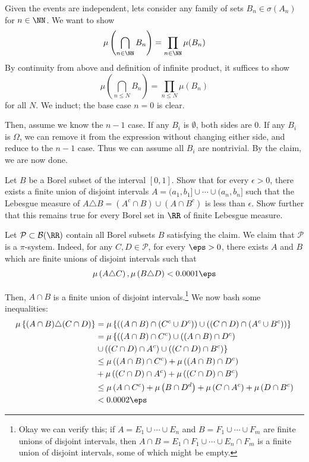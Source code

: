 \documentclass[11pt, headheight=30pt]{scrartcl}
\begin{document}
Given the events are independent, lets consider any family of
sets $B_n \in \sigma(A_n)$ for $n\in \NN$. We want to show
\[
    \mu\left(\bigcap_{n\in \NN} B_n\right) = \prod_{n \in \NN} \mu(B_n)
\]
By continuity from above and definition of infinite product,
it suffices to show
\[
    \mu\left(\bigcap_{n\leq N} B_n\right) = \prod_{n\leq N} \mu(B_n)    
\]
for all $N$. We induct; the base case $n = 0$ is clear.

Then, assume we know the $n-1$ case. If any $B_i$ is $\emptyset$,
both sides are $0$. If any $B_i$ is $\Omega$, we can remove
it from the expression without changing either side, and
reduce to the $n-1$ case. Thus we can assume all $B_i$ are
nontrivial. By the claim, we are now done.

\pagebreak
\begin{prob*}
    Let $B$ be a Borel subset of the interval $[0, 1]$.
    Show that for every $\epsilon > 0$, there exists a finite
    union of disjoint intervals $A = (a_1, b_1] \cup \cdots \cup (a_n, b_n]$
    such that the Lebesgue measure of $A \triangle B = (A^c \cap B) \cup (A \cap B^c)$
    is less than $\epsilon$.
    Show further that this remains true for every Borel set in $\RR$
    of finite Lebesgue measure.
\end{prob*}

Let $\mathcal{P} \subset \mathcal{B}(\RR)$ contain all Borel subsets $B$ satisfying
the claim. We claim that $\mathcal{P}$ is a $\pi$-system. Indeed, for any
$C,D\in \mathcal{P}$, for every $\eps > 0$, there exists $A$ and $B$ which
are finite unions of disjoint intervals such that
\[
    \mu\left(A\triangle C\right), \mu\left(B\triangle D\right) < 0.0001\eps
\]

Then, $A\cap B$ is a finite union of disjoint intervals.\footnote{
    Okay we can verify this; if $A = E_1\cup \cdots \cup E_n$ and
    $B = F_1 \cup \cdots \cup F_m$ are finite unions of disjoint intervals,
    then $A\cap B = E_1\cap F_1 \cup \cdots \cup E_n\cap F_m$ is a finite
    union of disjoint intervals, some of which might be empty.
} We now bash some inequalities:
\begin{align*}
    \mu\left\{(A\cap B)\triangle (C\cap D)\right\} &= \mu\left\{\left((A\cap B)\cap (C^c\cup D^c)\right) \cup \left((C\cap D)\cap (A^c\cup B^c)\right)\right\}\\
    &= \mu\left\{\left((A\cap B)\cap C^c\right) \cup  \left((A\cap B)\cap D^c\right)\right.\\
    &\left.\cup \left((C\cap D)\cap A^c\right) \cup \left((C\cap D)\cap B^c\right)\right\}\\
    &\leq \mu\left((A\cap B)\cap C^c\right) + \mu\left((A\cap B)\cap D^c\right)\\
    &+ \mu\left((C\cap D)\cap A^c\right) + \mu\left((C\cap D)\cap B^c\right)\\
    &\leq \mu\left(A\cap C^c\right) + \mu\left(B\cap D^d\right) + \mu\left(C\cap A^c\right) + \mu\left(D\cap B^c\right)\\
    &< 0.0002\eps
\end{align*}
\end{document}
